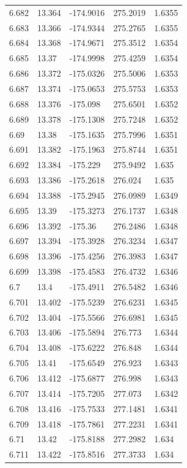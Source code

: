 \begin{tabular}{lllll}
6.682 & 13.364 & -174.9016 & 275.2019 & 1.6355 \\
6.683 & 13.366 & -174.9344 & 275.2765 & 1.6355 \\
6.684 & 13.368 & -174.9671 & 275.3512 & 1.6354 \\
6.685 & 13.37 & -174.9998 & 275.4259 & 1.6354 \\
6.686 & 13.372 & -175.0326 & 275.5006 & 1.6353 \\
6.687 & 13.374 & -175.0653 & 275.5753 & 1.6353 \\
6.688 & 13.376 & -175.098 & 275.6501 & 1.6352 \\
6.689 & 13.378 & -175.1308 & 275.7248 & 1.6352 \\
6.69 & 13.38 & -175.1635 & 275.7996 & 1.6351 \\
6.691 & 13.382 & -175.1963 & 275.8744 & 1.6351 \\
6.692 & 13.384 & -175.229 & 275.9492 & 1.635 \\
6.693 & 13.386 & -175.2618 & 276.024 & 1.635 \\
6.694 & 13.388 & -175.2945 & 276.0989 & 1.6349 \\
6.695 & 13.39 & -175.3273 & 276.1737 & 1.6348 \\
6.696 & 13.392 & -175.36 & 276.2486 & 1.6348 \\
6.697 & 13.394 & -175.3928 & 276.3234 & 1.6347 \\
6.698 & 13.396 & -175.4256 & 276.3983 & 1.6347 \\
6.699 & 13.398 & -175.4583 & 276.4732 & 1.6346 \\
6.7 & 13.4 & -175.4911 & 276.5482 & 1.6346 \\
6.701 & 13.402 & -175.5239 & 276.6231 & 1.6345 \\
6.702 & 13.404 & -175.5566 & 276.6981 & 1.6345 \\
6.703 & 13.406 & -175.5894 & 276.773 & 1.6344 \\
6.704 & 13.408 & -175.6222 & 276.848 & 1.6344 \\
6.705 & 13.41 & -175.6549 & 276.923 & 1.6343 \\
6.706 & 13.412 & -175.6877 & 276.998 & 1.6343 \\
6.707 & 13.414 & -175.7205 & 277.073 & 1.6342 \\
6.708 & 13.416 & -175.7533 & 277.1481 & 1.6341 \\
6.709 & 13.418 & -175.7861 & 277.2231 & 1.6341 \\
6.71 & 13.42 & -175.8188 & 277.2982 & 1.634 \\
6.711 & 13.422 & -175.8516 & 277.3733 & 1.634 \\

\end{tabular}

